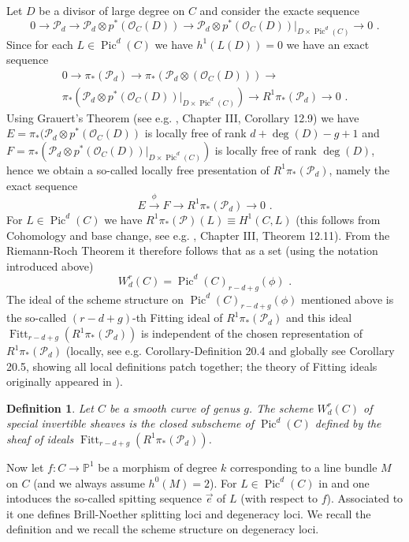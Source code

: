 \documentclass{article}
\DeclareMathOperator{\Pic}{Pic}
\DeclareMathOperator{\Fitt}{Fitt}
\newtheorem{definition}{Definition}
\theoremstyle{definition}
\theoremstyle{remark}
\begin{document}
Let $D$ be a divisor of large degree on $C$ and consider the exacte sequence
\[
0 \rightarrow \mathcal{P}_d \rightarrow \mathcal {P}_d \otimes p^*(\mathcal{O}_C(D)) \rightarrow \mathcal {P}_d \otimes p^*(\mathcal{O}_C(D))\vert _{D \times \Pic^d(C)} \rightarrow 0 \text { .}
\]
Since for each $L \in \Pic^d(C)$ we have $h^1(L(D))=0$ we have an exact sequence
\begin{multline*}
0 \rightarrow \pi_*(\mathcal{P}_d) \rightarrow \pi_*(\mathcal{P}_d \otimes (\mathcal{O}_C(D))) \rightarrow \\  \pi_*(\mathcal{P}_d \otimes p^*(\mathcal {O}_C(D))\vert _{D\times \Pic^d(C)}) \rightarrow R^1\pi_*(\mathcal {P}_d) \rightarrow 0 \text { .}
\end{multline*}
Using Grauert's Theorem (see e.g. \cite {ref1}, Chapter III, Corollary 12.9) we have $E=\pi_*(\mathcal{P}_d\otimes p^*(\mathcal{O}_C(D))$ is locally free of rank $d+\deg (D)-g+1$ and $F=\pi_*(\mathcal{P}_d \otimes p^*(\mathcal{O}_C(D))\vert _{D \times \Pic^d(C)})$ is locally free of rank $\deg (D)$, hence we obtain a so-called locally free presentation of $R^1\pi_*(\mathcal{P}_d)$, namely the exact sequence
\[
E \xrightarrow {\phi} F \rightarrow R^1\pi_*(\mathcal{P}_d) \rightarrow 0 \text { .}
\]
For $L \in \Pic^d(C)$ we have $R^1\pi_*(\mathcal{P})(L) \equiv H^1(C,L)$ (this follows from Cohomology and base change, see e.g. \cite{ref1}, Chapter III, Theorem 12.11).
From the Riemann-Roch Theorem it therefore follows that as a set (using the notation introduced above)
\[
W^r_d(C)=\Pic^d(C)_{r-d+g}(\phi) \text { .}
\]
The ideal of the scheme structure on $\Pic^d(C)_{r-d+g}(\phi)$ mentioned above is the so-called $(r-d+g)$-th Fitting ideal of $R^1\pi_*(\mathcal{P}_d)$ and this ideal $\Fitt _{r-d+g}(R^1\pi_*(\mathcal{P}_d))$ is independent of the chosen representation of $R^1\pi_* (\mathcal{P}_d)$ (locally, see e.g. \cite {ref5} Corollary-Definition 20.4 and globally see \cite{ref5} Corollary 20.5, showing all local definitions patch together; the theory of Fitting ideals originally appeared in \cite {ref14}).

\begin{definition}\label{schemespecialdivisors}
Let $C$ be a smooth curve of genus $g$.
The scheme $W^r_d(C)$ of special invertible sheaves is the closed subscheme of $\Pic^d(C)$ defined by the sheaf of ideals $\Fitt _{r-d+g}(R^1\pi_*(\mathcal{P}_d))$.
\end{definition}

Now let $f:  C \rightarrow \mathbb{P}^1$ be a morphism of degree $k$ corresponding to a line bundle $M$ on $C$ (and we always assume $h^0(M)=2$).
For $L \in \Pic^d(C)$ in \cite{ref7} and \cite{CPJ} one intoduces the so-called spitting sequence $\overrightarrow {e}$ of $L$ (with respect to $f$).
Associated to it one defines Brill-Noether splitting loci and degeneracy loci.
We recall the definition and we recall the scheme structure on degeneracy loci.
\end{document}
